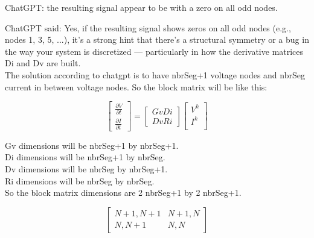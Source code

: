 \documentclass[12pt, letterpaper]{article}
\begin{document}
ChatGPT:
the resulting signal appear to be with a zero on all odd nodes.
	
	
	ChatGPT said:
	Yes, if the resulting signal shows zeros on all odd nodes (e.g., nodes 1, 3, 5, ...), it's a strong hint that there’s a structural symmetry or a bug in the way your system is discretized — particularly in how the derivative matrices Di and Dv are built.\\
	
The solution according to chatgpt is to have nbrSeg+1 voltage nodes and nbrSeg current in between voltage nodes. So the block matrix will be like this:

\begin{equation}
	\begin{bmatrix}
		\frac{\partial{V}}{\partial{t}} \\
		\frac{\partial{I}}{\partial{t}} 
	\end{bmatrix}	
	=
	\begin{bmatrix}
		Gv Di \\
		Dv Ri
	\end{bmatrix}
	\begin{bmatrix}
		V^k \\
		I^k \\
	\end{bmatrix}
\end{equation}

Gv dimensions will be nbrSeg+1 by nbrSeg+1.\\
Di dimensions will be nbrSeg+1 by nbrSeg.\\
Dv dimensions will be nbrSeg by nbrSeg+1.\\
Ri dimensions will be nbrSeg by nbrSeg.\\

So the block matrix dimensions are 2 nbrSeg+1 by 2 nbrSeg+1.

\begin{equation}
	\begin{bmatrix}
		N+1, N+1 &  N+1, N \\
		N, N+1 & N, N
	\end{bmatrix}
\end{equation}

	
\end{document}
